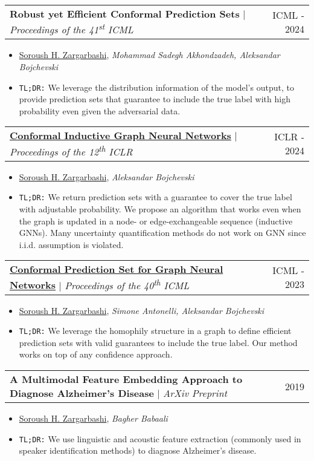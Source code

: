 \documentclass[letterpaper,11pt]{article}
\makeatletter
\newcommand{\resumeItem}[1]{
  \item\small{
    {#1 \vspace{-2pt}}
  }
}
\newcommand{\resumeProjectHeading}[2]{
    \item
    \begin{tabular*}{0.97\textwidth}{l@{\extracolsep{\fill}}r}
      \small#1 & #2 \\
    \end{tabular*}\vspace{-7pt}
}
\newcommand{\resumeItemListStart}{\begin{itemize}}
\newcommand{\resumeItemListEnd}{\end{itemize}\vspace{-5pt}}
\makeatother
\begin{document}
        \resumeProjectHeading
        {\textbf{Robust yet Efficient Conformal Prediction Sets} $|$ \footnotesize\emph{Proceedings of the 41\textsuperscript{st} ICML}}{ICML - 2024}
        \resumeItemListStart
            \resumeItem{\underline{Soroush H. Zargarbashi}, \textit{Mohammad Sadegh Akhondzadeh, Aleksandar Bojchevski}}
            \vspace{0.2em}
            \resumeItem{\texttt{TL;DR:} We leverage the distribution information of the model's output, to provide prediction sets that guarantee to include the true label with high probability even given the adversarial data.}
        \resumeItemListEnd

        \resumeProjectHeading
        {\textbf{\href{https://openreview.net/pdf?id=homn1jOKI5}{Conformal Inductive Graph Neural Networks}} $|$ \footnotesize\emph{Proceedings of the 12\textsuperscript{th} ICLR}}{ICLR - 2024}
        \resumeItemListStart
            \resumeItem{\underline{Soroush H. Zargarbashi}, \textit{Aleksandar Bojchevski}}
            \vspace{0.2em}
            \resumeItem{\texttt{TL;DR:} We return prediction sets with a guarantee to cover the true label with adjustable probability. We propose an algorithm that works even when the graph is updated in a node- or edge-exchangeable sequence (inductive GNNs). Many uncertainty quantification methods do not work on GNN since i.i.d. assumption is violated.}
        \resumeItemListEnd
        
        \resumeProjectHeading
        {\textbf{\href{https://proceedings.mlr.press/v202/h-zargarbashi23a.html}{Conformal Prediction Set for Graph Neural Networks}} $|$ \footnotesize\emph{Proceedings of the 40\textsuperscript{th} ICML}}{ICML - 2023}
        \resumeItemListStart
            \resumeItem{\underline{Soroush H. Zargarbashi}, \textit{Simone Antonelli, Aleksandar Bojchevski}}
            \vspace{0.2em}
            
            \resumeItem{\texttt{TL;DR:} We leverage the homophily structure in a graph to define efficient prediction sets with valid guarantees to include the true label. Our method works on top of any confidence approach.}
        \resumeItemListEnd
        
        \resumeProjectHeading
        {\textbf{A Multimodal Feature Embedding Approach to Diagnose Alzheimer’s Disease} $|$ \footnotesize\emph{ArXiv Preprint}}{2019}
        \resumeItemListStart
            \resumeItem{\underline{Soroush H. Zargarbashi}, \textit{Bagher Babaali}}
            \vspace{0.2em}
            \resumeItem{\texttt{TL;DR:} We use linguistic and acoustic feature extraction (commonly used in speaker identification methods) to diagnose Alzheimer's disease.}
        \resumeItemListEnd
\end{document}

